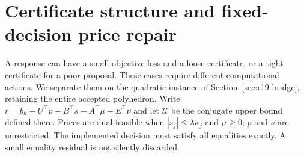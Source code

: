 \section{Certificate structure and fixed-decision price repair}\label{sec:r22-certification}
A response can have a small objective loss and a loose certificate, or a tight certificate for a poor proposal. These cases require different computational actions. We separate them on the quadratic instance of Section~\ref{sec:r19-bridge}, retaining the entire accepted polyhedron. Write
$r=b_h-U^\top p-B^\top s-A^\top\mu-E^\top\nu$ and let $\mathcal U$ be the conjugate upper bound defined there. Prices are dual-feasible when $|s_j|\leq\lambda\kappa_j$ and $\mu\geq0$; $p$ and $\nu$ are unrestricted. The implemented decision must satisfy all equalities exactly. A small equality residual is not silently discarded.

